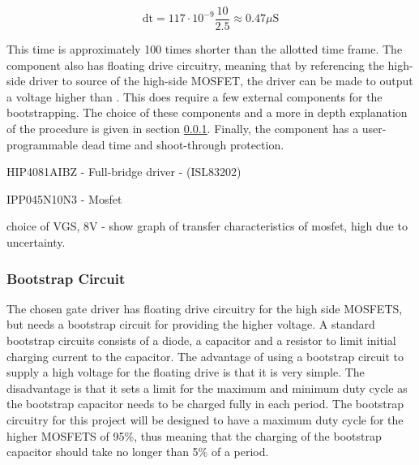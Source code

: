 \begin{equation}
	\text{dt} = 117\cdot10^{-9}\frac{10}{2.5}\approx0.47\mu\text{S}
\end{equation}

This time is approximately 100 times shorter than the allotted time frame.
The component also has floating drive circuitry, meaning that by referencing the high-side driver to source of the high-side MOSFET, the driver can be made to output a voltage higher than \vcc.
This does require a few external components for the bootstrapping.
The choice of these components and a more in depth explanation of the procedure is given in section \ref{ssub:bootstrap_circuit}.
Finally, the component has a user-programmable dead time and shoot-through protection. 

HIP4081AIBZ - Full-bridge driver - (ISL83202)

IPP045N10N3 - Mosfet

choice of VGS, 8V - show graph of transfer characteristics of mosfet, high due to uncertainty.





\subsubsection{Bootstrap Circuit}
\label{ssub:bootstrap_circuit}
The chosen gate driver has floating drive circuitry for the high side MOSFETS, but needs a bootstrap circuit for providing the higher voltage. 
A standard bootstrap circuits consists of a diode, a capacitor and a resistor to limit initial charging current to the capacitor. 
The advantage of using a bootstrap circuit to supply a high voltage for the floating drive is that it is very simple. 
The disadvantage is that it sets a limit for the maximum and minimum duty cycle as the bootstrap capacitor needs to be charged fully in each period.
The bootstrap circuitry for this project will be designed to have a maximum duty cycle for the higher MOSFETS of 95\%, thus meaning that the charging of the bootstrap capacitor should take no longer than 5\% of a period.  

